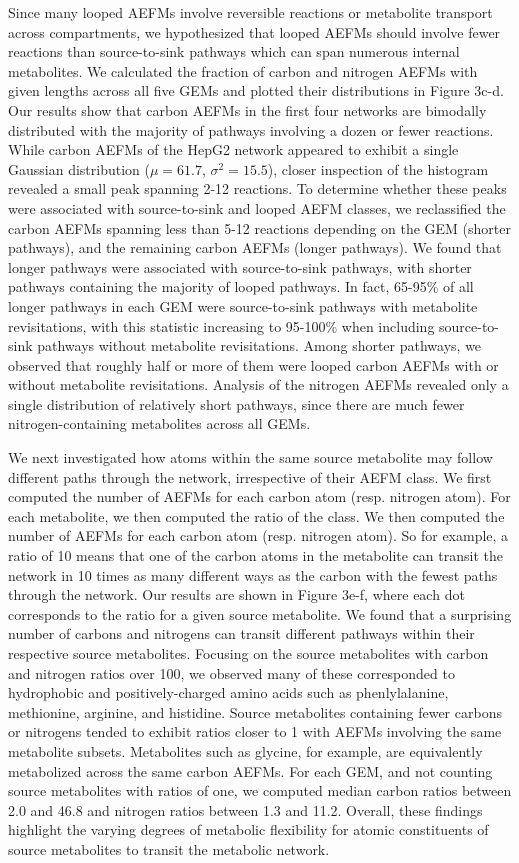 \documentclass[12pt]{article}
\begin{document}
Since many looped AEFMs involve reversible reactions or metabolite
transport across compartments, we hypothesized that looped AEFMs should
involve fewer reactions than source-to-sink pathways which can span
numerous internal metabolites. We calculated the fraction of carbon and
nitrogen AEFMs with given lengths across all five GEMs and plotted their
distributions in Figure 3c-d. Our results show that carbon AEFMs in the
first four networks are bimodally distributed with the majority of
pathways involving a dozen or fewer reactions. While carbon AEFMs of the
HepG2 network appeared to exhibit a single Gaussian distribution
($\mu=61.7$, $\sigma^2=15.5$), closer inspection of the histogram revealed
a small peak spanning 2-12 reactions. To determine whether these peaks
were associated with source-to-sink and looped AEFM classes, we
reclassified the carbon AEFMs spanning less than 5-12 reactions depending
on the GEM (shorter pathways), and the remaining carbon AEFMs (longer
pathways). We found that longer pathways were associated with
source-to-sink pathways, with shorter pathways containing the majority of
looped pathways. In fact, 65-95\% of all longer pathways in each GEM were
source-to-sink pathways with metabolite revisitations, with this statistic
increasing to 95-100\% when including source-to-sink pathways without
metabolite revisitations. Among shorter pathways, we observed that roughly
half or more of them were looped carbon AEFMs with or without metabolite
revisitations. Analysis of the nitrogen AEFMs revealed only a single
distribution of relatively short pathways, since there are much fewer
nitrogen-containing metabolites across all GEMs.

We next investigated how atoms within the same source metabolite may follow
different paths through the network, irrespective of their AEFM class. We first
computed the number of AEFMs for each carbon atom (resp. nitrogen atom). For
each metabolite, we then computed the ratio of the class. We then computed
the number of AEFMs for each carbon atom (resp. nitrogen atom). So for
example, a ratio of 10 means that one of the carbon atoms in the
metabolite can transit the network in 10 times as many different ways as
the carbon with the fewest paths through the network. Our results are
shown in Figure 3e-f, where each dot corresponds to the ratio for a given
source metabolite. We found that a surprising number of carbons and
nitrogens can transit different pathways within their respective source
metabolites. Focusing on the source metabolites with carbon and nitrogen
ratios over 100, we observed many of these corresponded to hydrophobic and
positively-charged amino acids such as phenlylalanine, methionine,
arginine, and histidine. Source metabolites containing fewer carbons or
nitrogens tended to exhibit ratios closer to
1 with AEFMs involving the same metabolite subsets. Metabolites such as
  glycine, for example, are equivalently metabolized across the same
  carbon AEFMs. For each GEM, and not counting source metabolites with
  ratios of one, we computed median carbon ratios between
  2.0 and 46.8 and nitrogen ratios between 1.3 and 11.2. Overall, these
  findings highlight the varying degrees of metabolic flexibility for
  atomic constituents of source metabolites to transit the metabolic
  network.
\end{document}
